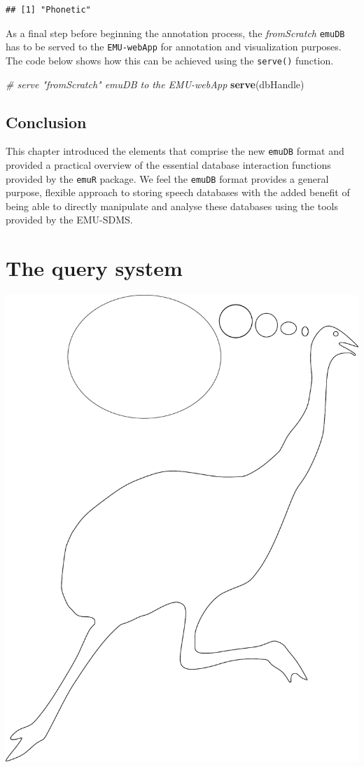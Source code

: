 \documentclass[]{book}
\newenvironment{Shaded}{\begin{snugshade}}{\end{snugshade}}
\newcommand{\CommentTok}[1]{\textcolor[rgb]{0.56,0.35,0.01}{\textit{#1}}}
\newcommand{\KeywordTok}[1]{\textcolor[rgb]{0.13,0.29,0.53}{\textbf{#1}}}
\newcommand{\NormalTok}[1]{#1}
\theoremstyle{definition}
\theoremstyle{definition}
\theoremstyle{definition}
\theoremstyle{remark}
\begin{document}
\begin{verbatim}
## [1] "Phonetic"
\end{verbatim}

As a final step before beginning the annotation process, the
\emph{fromScratch} \texttt{emuDB} has to be served to the
\texttt{EMU-webApp} for annotation and visualization purposes. The code
below shows how this can be achieved using the \texttt{serve()}
function.

\begin{Shaded}
\begin{Highlighting}[]
\CommentTok{# serve "fromScratch" emuDB to the EMU-webApp}
\KeywordTok{serve}\NormalTok{(dbHandle)}
\end{Highlighting}
\end{Shaded}

\hypertarget{conclusion-2}{%
\section{Conclusion}\label{conclusion-2}}

This chapter introduced the elements that comprise the new
\texttt{emuDB} format and provided a practical overview of the essential
database interaction functions provided by the \texttt{emuR} package. We
feel the \texttt{emuDB} format provides a general purpose, flexible
approach to storing speech databases with the added benefit of being
able to directly manipulate and analyse these databases using the tools
provided by the EMU-SDMS.

\hypertarget{chap:querysys}{%
\chapter{The query system}\label{chap:querysys}}

\begin{center}\includegraphics[width=0.5\linewidth]{pics/EMU-webAppEmu_query} \end{center}
\end{document}
